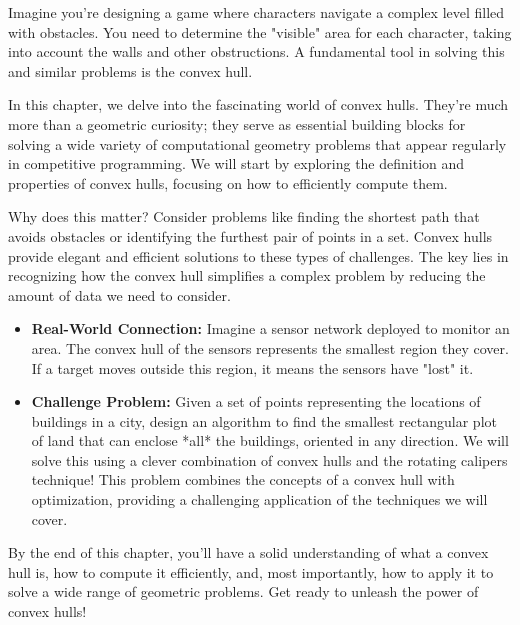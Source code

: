 \begin{chapterintro}
\label{ch:convex-hull-post-hull}
Imagine you're designing a game where characters navigate a complex level filled with obstacles. You need to determine the "visible" area for each character, taking into account the walls and other obstructions. A fundamental tool in solving this and similar problems is the convex hull.

In this chapter, we delve into the fascinating world of convex hulls. They're much more than a geometric curiosity; they serve as essential building blocks for solving a wide variety of computational geometry problems that appear regularly in competitive programming. We will start by exploring the definition and properties of convex hulls, focusing on how to efficiently compute them.

Why does this matter? Consider problems like finding the shortest path that avoids obstacles or identifying the furthest pair of points in a set. Convex hulls provide elegant and efficient solutions to these types of challenges. The key lies in recognizing how the convex hull simplifies a complex problem by reducing the amount of data we need to consider.

\begin{itemize}
    \item \textbf{Real-World Connection:} Imagine a sensor network deployed to monitor an area. The convex hull of the sensors represents the smallest region they cover. If a target moves outside this region, it means the sensors have "lost" it.
\end{itemize}

\begin{itemize}
    \item \textbf{Challenge Problem:} Given a set of points representing the locations of buildings in a city, design an algorithm to find the smallest rectangular plot of land that can enclose *all* the buildings, oriented in any direction.  We will solve this using a clever combination of convex hulls and the rotating calipers technique! This problem combines the concepts of a convex hull with optimization, providing a challenging application of the techniques we will cover.
\end{itemize}

By the end of this chapter, you'll have a solid understanding of what a convex hull is, how to compute it efficiently, and, most importantly, how to apply it to solve a wide range of geometric problems. Get ready to unleash the power of convex hulls!

\end{chapterintro} 